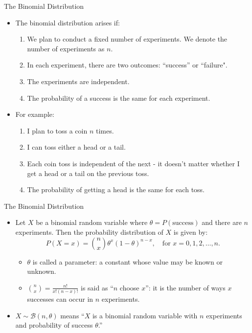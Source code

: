 \documentclass[10pt, handout, xcolor=table]{beamer}
\newcommand*\themecol{\usebeamercolor[fg]{structure}}
\begin{document}
\begin{frame}{The Binomial Distribution}
\begin{itemize}
\setlength{\itemsep}{15pt}
\item The {\themecol binomial distribution} arises if:
\begin{enumerate}
\vspace{0.25cm}
\setlength{\itemsep}{6pt}
\item<2-> We plan to conduct a fixed number of experiments. We denote the number of experiments as $n$.
\item<3-6,8-> In each experiment, there are two outcomes: ``success'' or ``failure".
\item<4-6, 9-> The experiments are independent.
\item<5-6, 10-> The probability of a success is the same for each experiment.
\end{enumerate}
\item<6-> For example: 
\begin{enumerate} \color{blue!70}
\vspace{0.25cm}
\setlength{\itemsep}{6pt}
\item<7-> I plan to toss a coin $n$ times.
\item<8-> I can toss either a head or a tail.
\item<9-> Each coin toss is independent of the next - it doesn't matter whether I get a head or a tail on the previous toss.
\item<10-> The probability of getting a head is the same for each toss.
\end{enumerate}
\end{itemize}
\end{frame}

\begin{frame}{The Binomial Distribution}
\begin{itemize}
\setlength{\itemsep}{15pt}
\item Let $X$ be a binomial random variable where $\theta = P(\text{success})$ and there are $n$ experiments. Then the probability distribution of $X$ is given by:
$$ P(X = x) = {n \choose x} \theta^x (1-\theta)^{n-x}, \quad \text{for } x = 0, 1, 2, \dots, n.$$
\begin{itemize}
\setlength{\itemsep}{6pt}
\item<2-> $\theta$ is called a {\themecol parameter}: a constant whose value may be known or unknown.
\item<3-> ${n \choose x} = \frac{n!}{x!(n-x)!}$ is said as ``$n$ choose $x$'': it is the number of ways $x$ successes can occur in $n$ experiments.
\end{itemize}
\item<4->[Note:] $X \sim \mathcal{B}(n, \theta)$ means ``$X$ is a binomial random variable with $n$ experiments and probability of success $\theta$.''
\end{itemize}
\end{frame}
\end{document}
